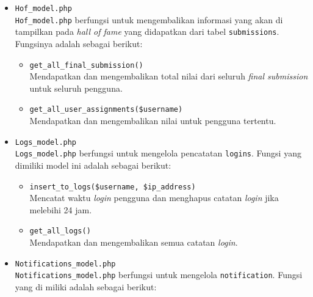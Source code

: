 \begin{itemize}
      \item \verb|Hof_model.php| \\
		  	\verb|Hof_model.php| berfungsi untuk mengembalikan informasi yang akan di tampilkan pada \textit{hall of fame} yang didapatkan dari tabel \verb|submissions|. Fungsinya adalah sebagai berikut:
	      \begin{itemize}
		      \item \verb|get_all_final_submission()| \\
					Mendapatkan dan mengembalikan total nilai dari seluruh \textit{final submission} untuk seluruh pengguna.
		      \item \verb|get_all_user_assignments($username)| \\
					Mendapatkan dan mengembalikan nilai untuk pengguna tertentu.
	      \end{itemize}

	\item \verb|Logs_model.php| \\
		  \verb|Logs_model.php| berfungsi untuk mengelola pencatatan \verb|logins|. Fungsi yang dimiliki model ini adalah sebagai berikut:

	      \begin{itemize}
		      \item \verb|insert_to_logs($username, $ip_address)| \\
		            Mencatat waktu \textit{login} pengguna dan menghapus catatan \textit{login} jika melebihi 24 jam.
		      \item \verb|get_all_logs()| \\
		            Mendapatkan dan mengembalikan semua catatan \textit{login}.
	      \end{itemize}

	\item \verb|Notifications_model.php| \\
	      \verb|Notifications_model.php| berfungsi untuk mengelola \verb|notification|. Fungsi yang di miliki adalah sebagai berikut:


\end{itemize}
